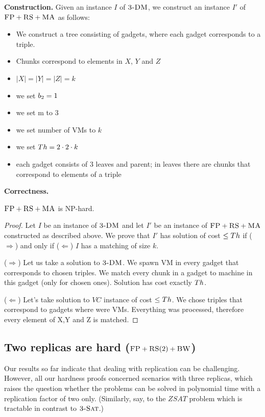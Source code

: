 \textbf{Construction.}
Given an instance $I$ of $\textsc{3-DM}$, we construct an instance $I'$ of
$\textsc{FP}+\textsc{RS}+\textsc{MA}$ as follows:
\begin{itemize}
\item We construct a tree consisting of gadgets, where each gadget corresponds to a triple.
\item Chunks correspond to elements in $X$, $Y$ and $Z$
\item $|X| = |Y| = |Z| = k$
\item we set $b_2=1$
\item we set m to 3
\item we set number of VMs to $k$
\item we set $Th=2 \cdot 2 \cdot k$
\item each gadget consists of 3 leaves and parent; in leaves there are
  chunks that correspond to elements of a triple
\end{itemize}

\textbf{Correctness.}

\begin{theorem}
$\textsc{FP}+\textsc{RS}+\textsc{MA}$ is NP-hard.
\end{theorem}
\begin{proof}
Let $I$ be an instance of $\textsc{3-DM}$ and let $I'$ be an instance of
$\textsc{FP}+\textsc{RS}+\textsc{MA}$ constructed as described above.
We prove that $I'$ has solution of cost $\leq Th$ if ($\Rightarrow$) and only if
($\Leftarrow$)
$I$ has a matching of size $k$.

($\Rightarrow$) Let us take a solution to $\textsc{3-DM}$. We spawn VM in every
gadget that corresponds to chosen triples. We match every chunk in a
gadget to machine in this gadget (only for chosen ones). Solution has
cost exactly $Th$.

($\Leftarrow$) Let's take solution to $VC$ instance of cost $\leq Th$. We
chose triples that correspond to gadgets where were VMs. Everything
was processed, therefore every element of X,Y and Z is matched.
\end{proof}


\subsection{Two replicas are hard ($\textsc{FP}+\textsc{RS}(2)+\textsc{BW}$)}\label{ssec:two}

Our results so far indicate that dealing with replication can be challenging.
However, all our hardness proofs concerned scenarios with three replicas,
which raises the question whether the problems can be solved in polynomial time
with a replication factor of two only. (Similarly, say, to the $ZSAT$ problem
which is tractable in contrast to $\textsc{3-Sat}$.)

